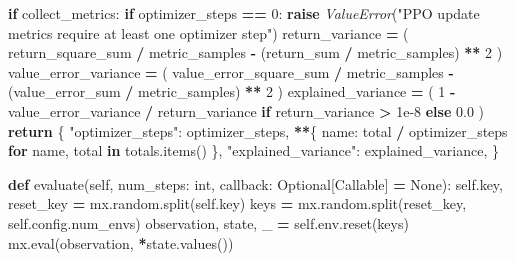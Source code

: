 \documentclass[
  chinese,
  11pt,
  letterpaper,
]{article}
\newenvironment{Shaded}{\begin{snugshade}}{\end{snugshade}}
\newcommand{\BuiltInTok}[1]{#1}
\newcommand{\ControlFlowTok}[1]{\textcolor[rgb]{0.13,0.29,0.53}{\textbf{#1}}}
\newcommand{\DecValTok}[1]{\textcolor[rgb]{0.00,0.00,0.81}{#1}}
\newcommand{\FloatTok}[1]{\textcolor[rgb]{0.00,0.00,0.81}{#1}}
\newcommand{\KeywordTok}[1]{\textcolor[rgb]{0.13,0.29,0.53}{\textbf{#1}}}
\newcommand{\NormalTok}[1]{#1}
\newcommand{\OperatorTok}[1]{\textcolor[rgb]{0.81,0.36,0.00}{\textbf{#1}}}
\newcommand{\PreprocessorTok}[1]{\textcolor[rgb]{0.56,0.35,0.01}{\textit{#1}}}
\newcommand{\StringTok}[1]{\textcolor[rgb]{0.31,0.60,0.02}{#1}}
\newcommand{\VariableTok}[1]{\textcolor[rgb]{0.00,0.00,0.00}{#1}}
\renewenvironment{Shaded}{\par\smallskip}{\par\smallskip}
\begin{document}
\begin{Shaded}
\begin{Highlighting}[]
        \ControlFlowTok{if}\NormalTok{ collect\_metrics:}
            \ControlFlowTok{if}\NormalTok{ optimizer\_steps }\OperatorTok{==} \DecValTok{0}\NormalTok{:}
                \ControlFlowTok{raise} \PreprocessorTok{ValueError}\NormalTok{(}\StringTok{"PPO update metrics require at least one optimizer step"}\NormalTok{)}
\NormalTok{            return\_variance }\OperatorTok{=}\NormalTok{ (}
\NormalTok{                return\_square\_sum }\OperatorTok{/}\NormalTok{ metric\_samples}
                \OperatorTok{{-}}\NormalTok{ (return\_sum }\OperatorTok{/}\NormalTok{ metric\_samples) }\OperatorTok{**} \DecValTok{2}
\NormalTok{            )}
\NormalTok{            value\_error\_variance }\OperatorTok{=}\NormalTok{ (}
\NormalTok{                value\_error\_square\_sum }\OperatorTok{/}\NormalTok{ metric\_samples}
                \OperatorTok{{-}}\NormalTok{ (value\_error\_sum }\OperatorTok{/}\NormalTok{ metric\_samples) }\OperatorTok{**} \DecValTok{2}
\NormalTok{            )}
\NormalTok{            explained\_variance }\OperatorTok{=}\NormalTok{ (}
                \DecValTok{1} \OperatorTok{{-}}\NormalTok{ value\_error\_variance }\OperatorTok{/}\NormalTok{ return\_variance}
                \ControlFlowTok{if}\NormalTok{ return\_variance }\OperatorTok{\textgreater{}} \FloatTok{1e{-}8}
                \ControlFlowTok{else} \FloatTok{0.0}
\NormalTok{            )}
            \ControlFlowTok{return}\NormalTok{ \{}
                \StringTok{"optimizer\_steps"}\NormalTok{: optimizer\_steps,}
                \OperatorTok{**}\NormalTok{\{}
\NormalTok{                    name: total }\OperatorTok{/}\NormalTok{ optimizer\_steps}
                    \ControlFlowTok{for}\NormalTok{ name, total }\KeywordTok{in}\NormalTok{ totals.items()}
\NormalTok{                \},}
                \StringTok{"explained\_variance"}\NormalTok{: explained\_variance,}
\NormalTok{            \}}

    \KeywordTok{def}\NormalTok{ evaluate(}\VariableTok{self}\NormalTok{, num\_steps: }\BuiltInTok{int}\NormalTok{, callback: Optional[Callable] }\OperatorTok{=} \VariableTok{None}\NormalTok{):}
        \VariableTok{self}\NormalTok{.key, reset\_key }\OperatorTok{=}\NormalTok{ mx.random.split(}\VariableTok{self}\NormalTok{.key)}
\NormalTok{        keys }\OperatorTok{=}\NormalTok{ mx.random.split(reset\_key, }\VariableTok{self}\NormalTok{.config.num\_envs)}
\NormalTok{        observation, state, \_ }\OperatorTok{=} \VariableTok{self}\NormalTok{.env.reset(keys)}
\NormalTok{        mx.}\BuiltInTok{eval}\NormalTok{(observation, }\OperatorTok{*}\NormalTok{state.values())}


\end{Highlighting}
\end{Shaded}
\end{document}

